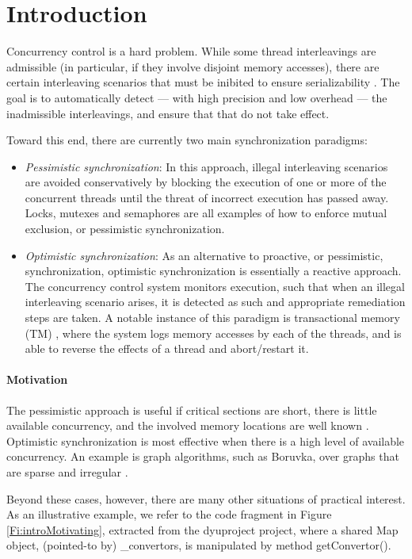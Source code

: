 \section{Introduction}

Concurrency control is a hard problem. While some thread interleavings are admissible (in particular, if they involve disjoint memory accesses), there are certain interleaving scenarios that must be inibited to ensure serializability \cite{Serializability}. The goal is to automatically detect --- with high precision and low overhead --- the inadmissible interleavings, and ensure that that do not take effect.  

Toward this end, there are currently two main synchronization paradigms:
\begin{itemize}
	\item \textit{Pessimistic synchronization}: In this approach, illegal interleaving scenarios are avoided conservatively by blocking the execution of one or more of the concurrent threads until the threat of incorrect execution has passed away. Locks, mutexes and semaphores are all examples of how to enforce mutual exclusion, or pessimistic synchronization.
	\item \textit{Optimistic synchronization}: As an alternative to proactive, or pessimistic, synchronization, optimistic synchronization is essentially a reactive approach. The concurrency control system monitors execution, such that when an illegal interleaving scenario arises, it is detected as such and appropriate remediation steps are taken. A notable instance of this paradigm is transactional memory (TM) \cite{DBLP:conf/isca/HerlihyM93}, where the system logs memory accesses by each of the threads, and is able to reverse the effects of a thread and abort/restart it.
\end{itemize}

\paragraph{Motivation} The pessimistic approach is useful if critical sections are short, there is little available concurrency, and the involved memory locations are well known \cite{AndiKleen}. Optimistic synchronization is most effective when there is a high level of available concurrency. An example is graph algorithms, such as Boruvka, over graphs that are sparse and irregular \cite{KulkarniGalois}.

Beyond these cases, however, there are many other situations of practical interest. As an illustrative example, we refer to the code fragment in Figure \ref{Fi:introMotivating}, extracted from the {\sf dyuproject} project, where a shared {\sf Map} object, (pointed-to by) {\sf \_convertors}, is manipulated by method {\sf getConvertor()}.

